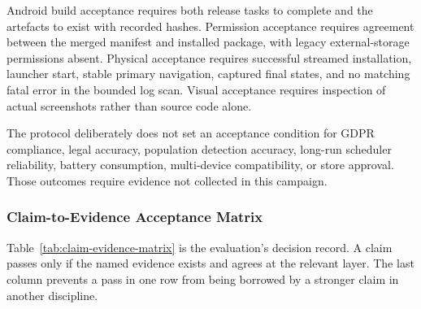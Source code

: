 Android build acceptance requires both release tasks to complete and the artefacts to exist with recorded hashes. Permission acceptance requires agreement between the merged manifest and installed package, with legacy external-storage permissions absent. Physical acceptance requires successful streamed installation, launcher start, stable primary navigation, captured final states, and no matching fatal error in the bounded log scan. Visual acceptance requires inspection of actual screenshots rather than source code alone.

The protocol deliberately does not set an acceptance condition for GDPR compliance, legal accuracy, population detection accuracy, long-run scheduler reliability, battery consumption, multi-device compatibility, or store approval. Those outcomes require evidence not collected in this campaign.

\subsubsection{Claim-to-Evidence Acceptance Matrix}

Table~\ref{tab:claim-evidence-matrix} is the evaluation's decision record. A claim passes only if the named evidence exists and agrees at the relevant layer. The last column prevents a pass in one row from being borrowed by a stronger claim in another discipline.

